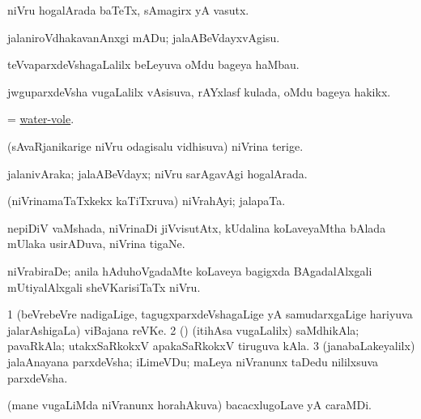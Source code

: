 \bentry
{} 
\gl{\nA}
\expl{}
\bmng
niVru hogalArada baTeTx, sAmagirx yA vasutx. 
\emng
\eentry

\bentry
{} 
\gl{\sakirx}
\expl{}
\bmng
jalaniroVdhakavanAnxgi mADu; jalaABeVdayxvAgisu. 
\emng
\eentry

\bentry
{} 
\gl{\nA}
\expl{}
\bmng
teVvaparxdeVshagaLalilx beLeyuva oMdu bageya haMbau. 
\emng
\eentry

\bentry
{} 
\gl{\nA}
\expl{}
\bmng
jwguparxdeVsha \mo vugaLalilx vAsisuva, rAYxlasf kulada, oMdu bageya hakikx. 
\emng
\eentry

\bentry
{} 
\gl{\nA}
\expl{}
\bmng
= \hyperlink{water-vole}{water-vole}. 
\emng
\eentry

\bentry
{} 
\gl{\nA}
\expl{}
\bmng
(sAvaRjanikarige niVru odagisalu vidhisuva) niVrina terige. 
\emng
\eentry

\bentry
{} 
\gl{\gu}
\expl{}
\bmng
jalanivAraka; jalaABeVdayx; niVru sarAgavAgi hogalArada. 
\emng
\eentry

\bentry
{} 
\gl{\nA}
\expl{}
\bmng
(niVrinamaTaTxkekx kaTiTxruva) niVrahAyi; jalapaTa. 
\emng
\eentry

\bentry
{} 
\gl{\nA}
\expl{}
\bmng
nepiDiV vaMshada, niVrinaDi jiVvisutAtx, kUdalina koLaveyaMtha bAlada mUlaka usirADuva, niVrina tigaNe. 
\emng
\eentry

\bentry
{} 
\gl{\nA}
\expl{}
\bmng
niVrabiraDe; anila hAduhoVgadaMte koLaveya bagigxda BAgadalAlxgali mUtiyalAlxgali sheVKarisiTaTx niVru. 
\emng
\eentry

\bentry
{} 
\gl{\nA}
\expl{}
\bmng
\bnum
\num{1} (beVrebeVre nadigaLige, tagugxparxdeVshagaLige yA samudarxgaLige hariyuva jalarAshigaLa) viBajana reVKe. 
\num{2} (\rUpa) (itihAsa \mo vugaLalilx) saMdhikAla; pavaRkAla; utakxSaRkokxV apakaSaRkokxV tiruguva kAla. 
\num{3} (janabaLakeyalilx) jalaAnayana parxdeVsha; iLimeVDu; maLeya niVranunx taDedu nililxsuva parxdeVsha. 
\enum
\emng
\eentry

\bentry
{} 
\gl{\nA}
\expl{}
\bmng
(mane \mo vugaLiMda niVranunx horahAkuva) bacacxlugoLave yA caraMDi. 
\emng
\eentry


